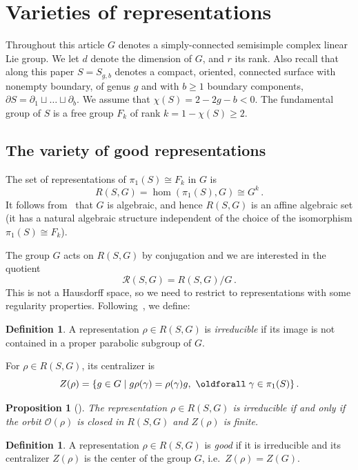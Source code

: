 \documentclass[11pt]{article}
\newtheorem{prop}[theo]{Proposition}
\theoremstyle{definition}
\newtheorem{defi}[theo]{Definition}
\numberwithin{equation}{section}
\numberwithin{figure}{section}
\numberwithin{table}{section}
\newcommand{\Rcal}{\mathcal{R}}
\newcommand{\Ocal}{\mathcal{O}}
\newcommand*\dG{{d}}
\newcommand*\rG{r}
\newcommand*\bS{b}
\renewcommand*{\forall}{\mathrel{\oldforall}}
\begin{document}
\section{Varieties of representations}\label{Section:VR}

Throughout this article $G$ denotes a simply-connected semisimple complex linear Lie group. We let $\dG$ denote the dimension of $G$, and $\rG$ its rank. Also recall that along this paper $S=S_{g,\bS}$ denotes a compact, oriented, connected surface with nonempty boundary, of genus $g$ and with $\bS\geq 1$ boundary components, $\partial S = \partial_1 \sqcup\dots\sqcup\partial_b$. We assume that $\chi(S)=2-2g-\bS<0$. The fundamental group of $S$ is a free group $F_k$ of rank $k=1-\chi(S)\geq 2$.


\subsection{The variety of good representations}

The set of representations of $\pi_1(S)\cong F_k$ in $G$ is
\[
R(S,G)=\hom(\pi_1(S),G)\cong G^k\,.
\]
It follows from~\cite[Chapter~4, Section~1.2]{OV} that $G$ is algebraic, and hence $R(S,G)$ is an affine algebraic set (it has a natural algebraic structure independent of the choice of the isomorphism $\pi_1(S)\cong F_k$).

The group $G$ acts on $R(S,G)$ by conjugation and we are interested in the quotient
\[
\Rcal(S,G)=R(S,G)/G\,.
\]
This is not a Hausdorff space, so we need to restrict to representations with some regularity properties. Following~\cite{JohnsonMillson}, we define:

\begin{defi}
A representation $\rho\in R(S,G)$ is \emph{irreducible} if its image is not contained in a proper parabolic subgroup of $G$.
\end{defi}

For $\rho\in R(S,G)$, its centralizer is
\[
Z(\rho)=\{ g\in G \mid g\rho(\gamma)=\rho(\gamma)g,\ \forall\gamma\in\pi_1(S)\}\,.
\]


\begin{prop}[{\cite[Proposition~1.1]{JohnsonMillson}}]
The representation $\rho\in R(S,G)$ is \emph{irreducible} if and only if the orbit $\Ocal(\rho)$ is closed in $R(S,G)$ and $Z(\rho)$ is finite.
\end{prop}



\begin{defi}\label{Definition:good}
A representation $\rho\in R(S,G)$ is
\emph{good} if it is irreducible and its centralizer $Z(\rho)$ is the center of the group $G$, i.e.~$Z(\rho)=Z(G)$.
\end{defi}
\end{document}
